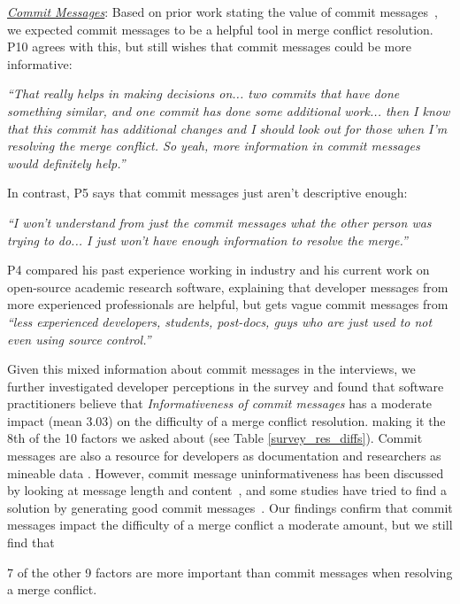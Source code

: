 \underline{\textit{Commit Messages}}:
Based on prior work stating the value of commit messages~\cite{yamauchi2014clustering}\cite{hindle2009automatic}\cite{cortes2014automatically}\cite{hattori2008nature}, we expected commit messages to be a helpful tool in merge conflict resolution. 
P10 agrees with this, but still wishes that commit messages could be more informative:
\begin{displayquote}
	\textit{``That really helps in making decisions on... two commits that have done something similar, and one commit has done some additional work... then I know that this commit has additional changes and I should look out for those when I'm resolving the merge conflict. So yeah, more information in commit messages would definitely help.''}
\end{displayquote}

In contrast, P5 says that commit messages just aren't descriptive enough:
\begin{displayquote}
\textit{``I won't understand from just the commit messages what the other person was trying to do... I just won't have enough information to resolve the merge.''}
\end{displayquote}

P4 compared his past experience working in industry and his current work on open-source academic research software, explaining that developer messages from more experienced professionals are helpful, but gets vague commit messages from \textit{``less experienced developers, students, post-docs, guys who are just used to not even using source control.''}

Given this mixed information about commit messages in the interviews, we further investigated developer perceptions in the survey and found that software practitioners believe that \textit{Informativeness of commit messages} has a moderate impact (mean 3.03) on the difficulty of a merge conflict resolution. making it the 8th  of the 10 factors we asked about (see Table \ref{survey_res_diffs}). Commit messages are also a resource for developers as documentation and researchers as mineable data \cite{d2010commit}. However, commit message uninformativeness has been discussed by looking at message length and content~\cite{maalej2010can}, and some studies have tried to find a solution by generating good commit messages~\cite{cortes2014}. Our findings confirm that commit messages impact the difficulty of a merge conflict a moderate amount, but we still find that 

\begin{tcolorbox}[enhanced,minipage boxed title,enhanced,title={Takeaway \arabic{takeawaycounter}},
attach boxed title to top left=
{xshift=0mm,yshift=-1mm},
boxed title style={size=small}]
7 of the other 9 factors are more important than commit messages when resolving a merge conflict.
\end{tcolorbox}
\addtocounter{takeawaycounter}{1}

